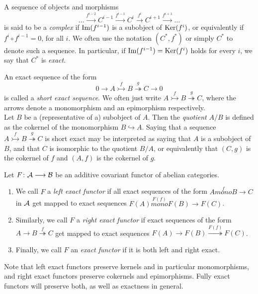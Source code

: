 \documentclass[a4paper]{article}
\def\into{\hookrightarrow}
\def\mono{\rightarrowtail}
\def\epi{\twoheadrightarrow}
\begin{document}
A sequence of objects and morphisms
\[
    \dots \stackrel{f^{i-2}}{\to} C^{i-1} \stackrel{f^{i-1}}{\to} C^{i} \stackrel{f^{i}}{\to} C^{i+1} \stackrel{f^{i+1}}{\to} \dots
\]
is said to be a \emph{complex} if $\operatorname{Im}(f^{i-1})$ is a subobject of $\operatorname{Ker}(f^i)$, or equivalently if $f^{i} \circ f^{i-1} = 0$, for all $i$. We often use the notation $(C^*, f^*)$ or simply $C^*$ to denote such a sequence. In particular, if $\operatorname{Im}(f^{i-1}) = \operatorname{Ker}(f^i)$ holds for every $i$, we say that $C^*$ is \emph{exact}.

An exact sequence of the form
\[
    0 \to A \stackrel{f}{\mono} B \stackrel{g}{\epi} C \to 0
\]
is called a \emph{short exact sequence}. We often just write $A \stackrel{f}{\mono} B \stackrel{g}{\epi} C$, where the arrows denote a monomorphism and an epimorphism respectively.\\

Let $B$ be a (representative of a) subobject of $A$. Then the \emph{quotient} $A/B$ is defined as the cokernel of the monomorphism $B\into A$. Saying that a sequence $A \stackrel{f}{\mono} B \stackrel{g}{\epi} C$ is short exact may be interpreted as saying that $A$ is a subobject of $B$, and that $C$ is isomorphic to the quotient $B/A$, or equivalently that $(C,g)$ is the cokernel of $f$ and $(A,f)$ is the cokernel of $g$.\\

\begin{Definition}
    Let $F\colon\mathcal{A}\longrightarrow \mathcal{B}$ be an additive covariant functor of abelian categories.
    \begin{enumerate}
        \item We call $F$ a \emph{left exact functor} if all exact sequences of the form $A \stackrel{f}{mono} B \to C$ in $\mathcal{A}$ get mapped to exact sequences $F(A) \stackrel{F(f)}{mono} F(B) \to F(C)$.
        \item Similarly, we call $F$ a \emph{right exact functor} if exact sequences of the form $A \to B \stackrel{f}{\epi} C$ get mapped to exact sequences $F(A) \to F(B) \stackrel{F(f)}{\epi} F(C)$.
        \item Finally, we call $F$ an \emph{exact functor} if it is both left and right exact.
    \end{enumerate}
\end{Definition}
Note that left exact functors preserve kernels and in particular monomorphisms, and right exact functors preserve cokernels and epimorphisms. Fully exact functors will preserve both, as well as exactness in general.\\
\end{document}
